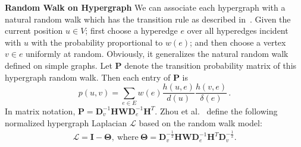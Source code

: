 \textbf{Random Walk on Hypergraph}
\label{sec:rw_hyper}
We can associate each hypergraph with a natural random walk which has the transition rule as
described in~\cite{Zhou06learningwith}. Given the current position $u \in V$; first choose a hyperedge $e$ over all hyperedges
incident with $u$ with the probability proportional to $w(e)$; and then choose a vertex $v \in e$
uniformly at random. Obviously, it generalizes the natural random walk defined on simple
graphs. Let $\mathbf{P}$ denote the transition probability matrix of this hypergraph random walk.
Then each entry of $\mathbf{P}$ is
\[
p(u,v) = \sum_{e\in E}{w(e)\frac{h(u,e)}{d(u)}\frac{h(v,e)}{\delta(e)}}\, .
\]
In matrix notation, $\mathbf{P}=\mathbf{D}_v^{-1}\mathbf{HWD}_e^{-1}\mathbf{H}^T$.
Zhou et al.~\cite{Zhou06learningwith} define the following normalized hypergraph Laplacian $\mathcal{L}$ based on the random walk model:
\begin{align}
\mathcal{L}=\mathbf{I}-\mathbf{\Theta},   ~\mathrm{where}~ \mathbf{\Theta}=\mathbf{D}_v^{-\frac12}\mathbf{HWD}_e^{-1}\mathbf{H}^T\mathbf{D}_v^{-\frac12} \label{eq:normalizedHyperL}.
\end{align}

